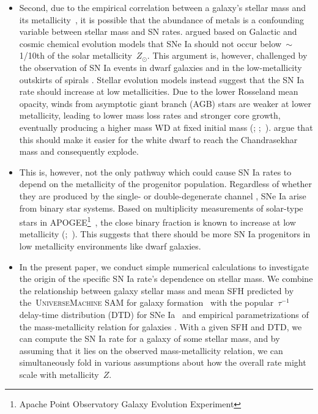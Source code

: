\documentclass[ms.tex]{subfiles}
\begin{document}
\begin{itemize}
	\item Second, due to the empirical correlation between a galaxy's stellar
	mass and its metallicity~\citep{Tremonti2004}, it is possible that the
	abundance of metals is a confounding variable between stellar mass and
	SN rates.
	\citet{Kobayashi1998} argued based on Galactic and cosmic chemical
	evolution models that SNe Ia should not occur below~$\sim$1/10th of the
	solar metallicity~$Z_\odot$.
	This argument is, however, challenged by the observation of SN Ia events in
	dwarf galaxies and in the low-metallicity outskirts of spirals
	\citep[e.g.][]{Prieto2008}.
	Stellar evolution models instead suggest that the SN Ia rate should
	increase at low metallicities.
	Due to the lower Rosseland mean opacity, winds from asymptotic giant branch
	(AGB) stars are weaker at lower metallicity, leading to lower mass loss
	rates and stronger core growth, eventually producing a higher mass WD at
	fixed initial mass (\citealp{Umeda1999, Willson2000, Marigo2007};
	\citealp*{Meng2008};~\citealp{Zhao2012, Kalirai2014}).
	\citet{Kistler2013} argue that this should make it easier for the white
	dwarf to reach the Chandrasekhar mass and consequently explode.

	\item This is, however, not the only pathway which could cause SN Ia rates
	to depend on the metallicity of the progenitor population.
	Regardless of whether they are produced by the single-
	\citep[e.g.][]{Whelan1973} or double-degenerate channel
	\citep[e.g.][]{Iben1984, Webbink1984}, SNe Ia arise from binary star
	systems.
	Based on multiplicity measurements of solar-type stars in APOGEE\footnote{
		Apache Point Observatory Galaxy Evolution Experiment
	}~\citep{Majewski2017}, the close binary fraction is known to increase
	at low metallicity (\citealp{Badenes2018};~\citealp*{Moe2019}).
	This suggests that there should be more SN Ia progenitors in low
	metallicity environments like dwarf galaxies.

	\item In the present paper, we conduct simple numerical calculations to
	investigate the origin of the specific SN Ia rate's dependence on stellar
	mass.
	We combine the relationship between galaxy stellar mass and mean SFH
	predicted by the~\textsc{UniverseMachine} SAM for galaxy
	formation~\citep{Behroozi2019} with the popular~$\tau^{-1}$ delay-time
	distribution (DTD) for SNe Ia~\citep[e.g.][]{Maoz2012a} and empirical
	parametrizations of the mass-metallicity relation for galaxies
	\citep{Andrews2013, Zahid2014}.
	With a given SFH and DTD, we can compute the SN Ia rate for a galaxy of
	some stellar mass, and by assuming that it lies on the observed
	mass-metallicity relation, we can simultaneously fold in various
	assumptions about how the overall rate might scale with metallicity~$Z$.

\end{itemize}
\end{document}
